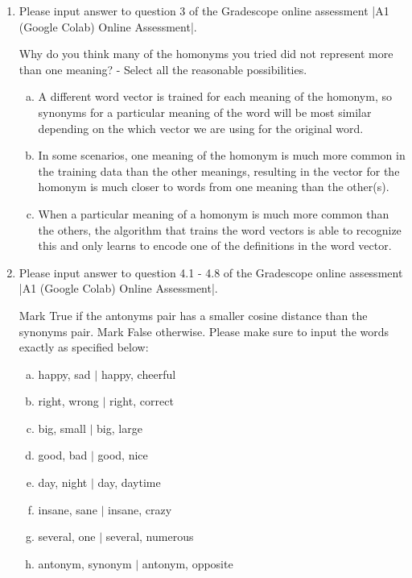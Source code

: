 \begin{enumerate}[1.]
\item {}

Please input answer to question 3 of the Gradescope online assessment |A1 (Google Colab) Online Assessment|.

Why do you think many of the homonyms you tried did not represent more than one meaning? - Select all the reasonable possibilities.

\begin{enumerate}[a.]
\item A different word vector is trained for each meaning of the homonym, so synonyms for a particular meaning of the word will be most similar depending on the which vector we are using for the original word.

\item In some scenarios, one meaning of the homonym is much more common in the training data than the other meanings, resulting in the vector for the homonym is much closer to words from one meaning than the other(s).

\item When a particular meaning of a homonym is much more common than the others, the algorithm that trains the word vectors is able to recognize this and only learns to encode one of the definitions in the word vector.
\end{enumerate}

\item {}

Please input answer to question 4.1 - 4.8 of the Gradescope online assessment |A1 (Google Colab) Online Assessment|.

Mark True if the antonyms pair has a smaller cosine distance than the synonyms pair. Mark False otherwise. Please make sure to input the words exactly as specified below: 
\begin{enumerate}[a.]
\item \textsf{happy, sad $\vert$ happy, cheerful}
\item \textsf{right, wrong $\vert$ right, correct}
\item \textsf{big, small $\vert$ big, large}
\item \textsf{good, bad $\vert$ good, nice}
\item \textsf{day, night $\vert$ day, daytime}
\item \textsf{insane, sane $\vert$ insane, crazy}
\item \textsf{several, one $\vert$ several, numerous}
\item \textsf{antonym, synonym $\vert$ antonym, opposite}
\end{enumerate}


\end{enumerate}
